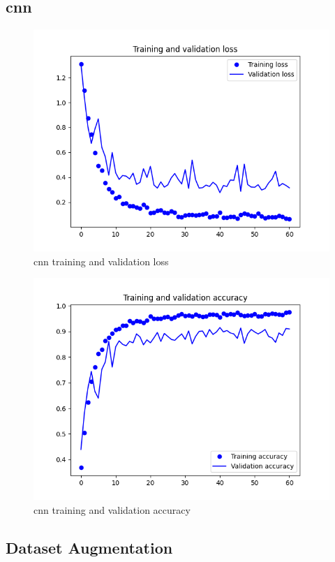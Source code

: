 \documentclass[10pt,twocolumn,letterpaper]{article}
\begin{document}
\subsection{\acrlong{cnn}}

\begin{figure}[H]
  \centering
   \includegraphics[width=0.9\linewidth, trim={3em, 2em, 4em, 4em}, clip]{cnn_loss}
   \caption{\acrshort{cnn} training and validation loss}
   \label{fig:cnn_loss}
\end{figure}

\begin{figure}[H]
  \centering
   \includegraphics[width=0.9\linewidth, trim={3em, 2em, 4em, 4em}, clip]{cnn_accuracy}
   \caption{\acrshort{cnn} training and validation accuracy}
   \label{fig:cnn_accuracy}
\end{figure}

\subsection{Dataset Augmentation}
\end{document}
